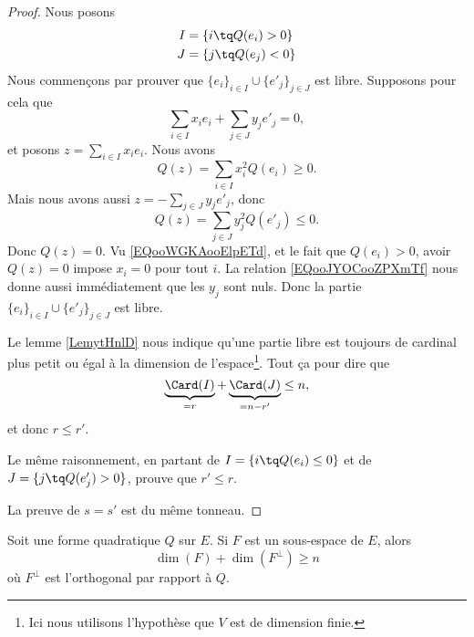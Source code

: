 \begin{proof}
	Nous posons
	\begin{subequations}
		\begin{align}
			I & =\{ i\tq Q(e_i)>0 \} \\
			J & =\{ j\tq Q(e_j)<0 \}
		\end{align}
	\end{subequations}
	Nous commençons par prouver que \( \{ e_i \}_{i\in I}\cup\{ e'_j \}_{j\in J}\) est libre. Supposons pour cela que
	\begin{equation}
		\sum_{i\in I}x_ie_i+\sum_{j\in J}y_je'_j=0,
	\end{equation}
	et posons \( z=\sum_{i\in I}x_ie_i\). Nous avons
	\begin{equation}        \label{EQooWGKAooElpETd}
		Q(z)=\sum_{i\in I}x_i^2Q(e_i)\geq 0.
	\end{equation}
	Mais nous avons aussi \( z=-\sum_{j\in J}y_je'_j\), donc
	\begin{equation}        \label{EQooJYOCooZPXmTf}
		Q(z)=\sum_{j\in J}y_j^2Q(e'_j)\leq 0.
	\end{equation}
	Donc \( Q(z)=0\). Vu \eqref{EQooWGKAooElpETd}, et le fait que \( Q(e_i)>0\), avoir \( Q(z)=0\) impose \( x_i=0\) pour tout \( i\). La relation \eqref{EQooJYOCooZPXmTf} nous donne aussi immédiatement que les \( y_j\) sont nuls. Donc la partie \( \{ e_i \}_{i\in I}\cup\{ e'_j \}_{j\in J}\) est libre.

	Le lemme \ref{LemytHnlD} nous indique qu'une partie libre est toujours de cardinal plus petit ou égal à la dimension de l'espace\footnote{Ici nous utilisons l'hypothèse que \( V\) est de dimension finie.}. Tout ça pour dire que
	\begin{equation}
		\underbrace{\Card(I)}_{=r}+\underbrace{\Card(J)}_{=n-r'}\leq n,
	\end{equation}
	et donc \( r\leq r'\).

	Le même raisonnement, en partant de \( I=\{ i\tq Q(e_i)\leq 0 \}\) et de \( J=\{ j\tq Q(e'_j)>0 \}\), prouve que \( r'\leq r\).

	La preuve de \( s=s'\) est du même tonneau.
\end{proof}

\begin{lemma}     \label{LEMooOQIDooPSOeXL}
	Soit une forme quadratique \( Q\) sur \( E\). Si \( F\) est un sous-espace de \( E\), alors
	\begin{equation}
		\dim(F)+\dim(F^{\perp})\geq n
	\end{equation}
	où \( F^{\perp}\) est l'orthogonal par rapport à \( Q\).
\end{lemma}

